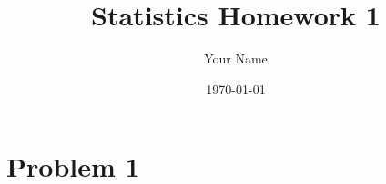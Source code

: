 \documentclass{article}
\title{Statistics Homework 1}
\author{Your Name}
\date{\today}
\begin{document}
\maketitle

\section{Problem 1}

\end{document}

